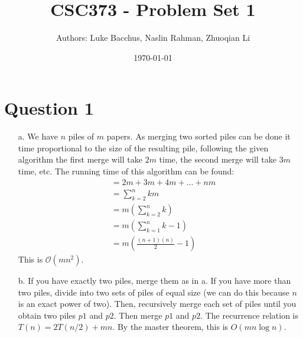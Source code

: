 \documentclass[12pt]{article}
\title{\textbf{CSC373 - Problem Set 1}}
\author{Authors: Luke Bacchus, Naslin Rahman, Zhuoqian Li}
\date{\today}
\begin{document}
\maketitle
\section*{Question 1}
\begin{enumerate}
    \item[a.] We have $n$ piles of $m$ papers. As merging two sorted piles can be done it time proportional to the size of the resulting pile, following the given algorithm the first merge will take $2m$ time, the second merge will take $3m$ time, etc. 
    The running time of this algorithm can be found:
    \begin{align*}
        &= 2m + 3m + 4m + ... + nm \\
        &= \sum_{k=2}^n km \\
        &= m(\sum_{k=2}^n k) \\
        &= m(\sum_{k=1}^n k-1) \\
        &= m(\frac{(n+1)(n)}{2} - 1)
    \end{align*}
    This is $\mathcal{O}(mn^2)$.
    \item[b.] If you have exactly two piles, merge them as in a. If you have more than two piles, divide into two sets of piles of equal size (we can do this because $n$ is an exact power of two). Then, recursively merge each set of piles until you obtain two piles $p1$ and $p2$. Then merge $p1$ and $p2$. The recurrence relation is $T(n) = 2T(n/2) + mn$. By the master theorem, this is $O(mn \log n)$.
\end{enumerate}
\newpage
\end{document}
